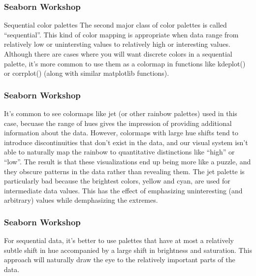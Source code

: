 
\begin{frame}[fragile]
\frametitle{Seaborn Workshop}
\large

Sequential color palettes
The second major class of color palettes is called “sequential”. This kind of color mapping is appropriate when data range from relatively low or unintersting values to relatively high or interesting values. Although there are cases where you will want discrete colors in a sequential palette, it’s more common to use them as a colormap in functions like kdeplot() or corrplot() (along with similar matplotlib functions).
\end{frame}
\begin{frame}[fragile]
	\frametitle{Seaborn Workshop}
	\large
It’s common to see colormaps like jet (or other rainbow palettes) used in this case, becuase the range of hues gives the impression of providing additional information about the data. However, colormaps with large hue shifts tend to introduce discontinuities that don’t exist in the data, and our visual system isn’t able to naturally map the rainbow to quantitative distinctions like “high” or “low”. The result is that these visualizations end up being more like a puzzle, and they obscure patterns in the data rather than revealing them. The jet palette is particularly bad because the brightest colors, yellow and cyan, are used for intermediate data values. This has the effect of emphasizing uninteresting (and arbitrary) values while demphasizing the extremes.
\end{frame}
\begin{frame}[fragile]
	\frametitle{Seaborn Workshop}
	\large
For sequential data, it’s better to use palettes that have at most a relatively subtle shift in hue accompanied by a large shift in brightness and saturation. This approach will naturally draw the eye to the relatively important parts of the data.
\end{frame}
